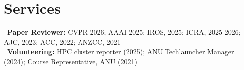 \section*{Services}
\textbullet~\textbf{Paper Reviewer:} CVPR 2026; AAAI 2025; IROS, 2025; ICRA, 2025-2026; AJC, 2023; ACC, 2022; ANZCC, 2021\\[0.5em]
\textbullet~\textbf{Volunteering:} HPC cluster reporter (2025); ANU Techlauncher Manager (2024); Course Representative, ANU (2021)